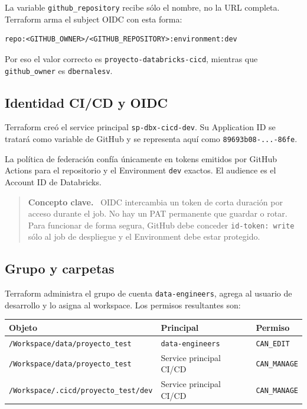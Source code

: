 \documentclass[11pt,a4paper]{article}
\newenvironment{aprendizaje}{
  \begin{quote}\color{dbblue}\textbf{Concepto clave.}\ }{
  \end{quote}}
\begin{document}
La variable \texttt{github\_repository} recibe sólo el nombre, no la URL completa. Terraform arma
el subject OIDC con esta forma:

\begin{lstlisting}
repo:<GITHUB_OWNER>/<GITHUB_REPOSITORY>:environment:dev
\end{lstlisting}

Por eso el valor correcto es \texttt{proyecto-databricks-cicd}, mientras que
\texttt{github\_owner} es \texttt{dbernalesv}.

\subsection{Identidad CI/CD y OIDC}

Terraform creó el service principal \texttt{sp-dbx-cicd-dev}. Su Application ID se tratará como
variable de GitHub y se representa aquí como \texttt{89693b08-...-86fe}.

La política de federación confía únicamente en tokens emitidos por GitHub Actions para el repositorio
y el Environment \texttt{dev} exactos. El audience es el Account ID de Databricks.

\begin{aprendizaje}
OIDC intercambia un token de corta duración por acceso durante el job. No hay un PAT permanente que
guardar o rotar. Para funcionar de forma segura, GitHub debe conceder \texttt{id-token: write} sólo
al job de despliegue y el Environment debe estar protegido.
\end{aprendizaje}

\subsection{Grupo y carpetas}

Terraform administra el grupo de cuenta \texttt{data-engineers}, agrega al usuario de desarrollo y
lo asigna al workspace. Los permisos resultantes son:

\begin{tabularx}{\textwidth}{@{}p{}p{}X@{}}
\toprule
\textbf{Objeto} & \textbf{Principal} & \textbf{Permiso} \\
\midrule
\texttt{/Workspace/data/proyecto\_test} & \texttt{data-engineers} & \texttt{CAN\_EDIT} \\
\texttt{/Workspace/data/proyecto\_test} & Service principal CI/CD & \texttt{CAN\_MANAGE} \\
\texttt{/Workspace/.cicd/proyecto\_test/dev} & Service principal CI/CD & \texttt{CAN\_MANAGE} \\
\bottomrule
\end{tabularx}
\end{document}
